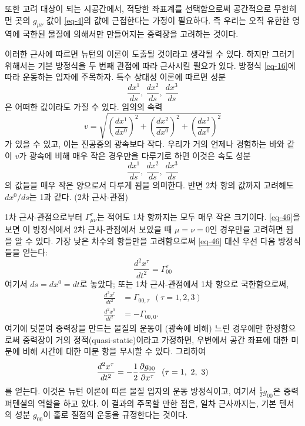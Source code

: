 또한 고려 대상이 되는 시공간에서, 적당한 좌표계를 선택함으로써 공간적으로 무한히 먼 곳의 $g_{\mu\nu}$ 값이  \eqref{eq-4}의 값에 근접한다는 가정이 필요하다. 즉 우리는 오직 유한한 영역에 국한된 물질에 의해서만 만들어지는 중력장을 고려하는 것이다.

이러한 근사에 따르면 뉴턴의 이론이 도출될 것이라고 생각될 수 있다. 하지만 그러기 위해서는 기본 방정식을 두 번째 관점에 따라 근사시킬 필요가 있다. 방정식 \eqref{eq-16}에 따라 운동하는 입자에 주목하자. 특수 상대성 이론에 따르면 성분
\begin{equation*}
	\frac{dx^1}{ds},~\frac{dx^2}{ds},~\frac{dx^3}{ds}
\end{equation*}
은 어떠한 값이라도 가질 수 있다. 임의의 속력
\begin{equation*}
	v=\sqrt{\left(\frac{dx^1}{dx^0}\right)^2 + \left(\frac{dx^2}{dx^0}\right)^2 + \left(\frac{dx^3}{dx^0}\right)^2}
\end{equation*}
가 있을 수 있고, 이는 진공중의 광속보다 작다. 우리가 거의 언제나 경험하는 바와 같이 $v$가 광속에 비해 매우 작은 경우만을 다루기로 하면 이것은 속도 성분
\begin{equation*}
	\frac{dx^1}{ds},~\frac{dx^2}{ds},~\frac{dx^3}{ds}
\end{equation*}
의 값들을 매우 작은 양으로서 다루게 됨을 의미한다. 반면 2차 항의 값까지 고려해도 $dx^0/ds$는 1과 같다. (2차 근사-관점)

1차 근사-관점으로부터 $\Gamma_{\mu\nu}^\tau$는 적어도 1차 항까지는 모두 매우 작은 크기이다. \eqref{eq-46}을 보면 이 방정식에서 2차 근사-관점에서 보았을 때 $\mu=\nu=0$인 경우만을 고려하면 됨을 알 수 있다. 가장 낮은 차수의 항들만을 고려함으로써 \eqref{eq-46} 대신 우선 다음 방정식들을 얻는다:
\begin{equation*}
	\frac{d^2 x^\tau}{dt^2}=\Gamma_{0 0}^\tau
\end{equation*}
여기서 $ds = dx^0 = dt$로 놓았다; 또는 1차 근사-관점에서 1차 항으로 국한함으로써,
\begin{equation*}
	\begin{aligned}
		\frac{d^2 x^\tau}{dt^2} &= \Gamma_{0 0 , \tau}~~ (\tau = 1, 2, 3)\\
		\frac{d^2 x^0}{dt^2} &= -\Gamma_{0 0 , 0}.
	\end{aligned}
\end{equation*}
여기에 덧붙여 중력장을 만드는 물질의 운동이 (광속에 비해) 느린 경우에만 한정함으로써 중력장이 거의 정적(quasi-static)이라고 가정하면, 우변에서 공간 좌표에 대한 미분에 비해 시간에 대한 미분 항을 무시할 수 있다. 그리하여
\begin{equation} \label{eq-67}
	\frac{d^2 x^\tau}{dt^2} = -\frac{1}{2} {\frac{{\partial}{g_{0 0}}}{{\partial}{x^\tau}}} ~~(\tau=1,\ 2,\ 3)
\end{equation}
를 얻는다. 이것은 뉴턴 이론에 따른 물질 입자의 운동 방정식이고, 여기서 $\frac{1}{2}g_{0 0}$은 중력 퍼텐셜의 역할을 하고 있다. 이 결과의 주목할 만한 점은, 일차 근사까지는, 기본 텐서의 성분 $g_{0 0}$이 홀로 질점의 운동을 규정한다는 것이다.

